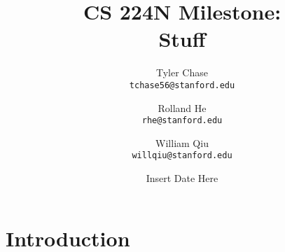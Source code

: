\documentclass[11pt]{article}
\title{\vspace{-2cm}CS 224N Milestone: \\ Stuff}
\author{Tyler Chase \\ \texttt{tchase56@stanford.edu} \and
  Rolland He \\ \texttt{rhe@stanford.edu} \and
  William Qiu \\ \texttt{willqiu@stanford.edu}}
\date{Insert Date Here}
\begin{document}
\maketitle

\vspace{-1cm}
\section{Introduction}


\end{document}
